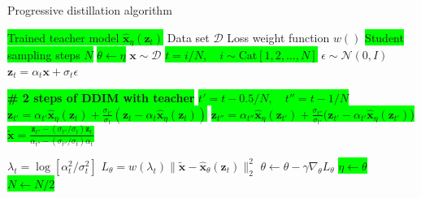 \begin{algorithm}[H]
    \centering
    \caption{Progressive distillation algorithm \cite{v_prediction}}
    \label{alg:progressive_distillation_algorithm}
    \begin{algorithmic}
        \Require \colorbox{lime} {Trained teacher model $\hat{\mathbf{x}}_{\eta}(\mathbf{z}_t)$}
        \Require Data set $\mathcal{D}$
        \Require Loss weight function $w()$
        \Require \colorbox{lime}{Student sampling steps $N$}
            \State \colorbox{lime}{$\theta \gets \eta$} 
                \State $\mathbf{x} \sim \mathcal{D}$
                \State \colorbox{lime}{$t = i/N, \quad i \sim \text{Cat}[1,2,\dots,N]$}
                \State $\epsilon \sim \mathcal{N}(0, I)$
                \State $\mathbf{z}_t = \alpha_t \mathbf{x} + \sigma_t \epsilon$
                
                \State \colorbox{lime}{{\textbf{\# 2 steps of DDIM with teacher}}}
                \State \colorbox{lime}{{$t' = t - 0.5/N, \quad t'' = t - 1/N$}}
                \State \colorbox{lime}{{$\mathbf{z}_{t'} = \alpha_{t'} \hat{\mathbf{x}}_{\eta}(\mathbf{z}_t) + \frac{\sigma_{t'}}{\sigma_t} (\mathbf{z}_t - \alpha_t \hat{\mathbf{x}}_{\eta}(\mathbf{z}_t))$}}
                \State \colorbox{lime}{{$\mathbf{z}_{t''} = \alpha_{t''} \hat{\mathbf{x}}_{\eta}(\mathbf{z}_{t'}) + \frac{\sigma_{t''}}{\sigma_{t'}} (\mathbf{z}_{t'} - \alpha_{t'} \hat{\mathbf{x}}_{\eta}(\mathbf{z}_{t'})$)}}
                \State \colorbox{lime}{{$\tilde{\mathbf{x}} = \frac{\mathbf{z}_{t''} - (\sigma_{t''}/\sigma_t) \mathbf{z}_t}{\alpha_{t''} - (\sigma_{t''}/\sigma_t) \alpha_t}$}} 
                
                \State $\lambda_t = \log[\alpha_t^2/\sigma_t^2]$
                \State $L_{\theta} = w(\lambda_t) \|\tilde{\mathbf{x}} - \hat{\mathbf{x}}_{\theta}(\mathbf{z}_t)\|_2^2$
                \State $\theta \gets \theta - \gamma \nabla_{\theta} L_{\theta}$
            \EndWhile
            \State \colorbox{lime}{$\eta \gets \theta$} 
            \State \colorbox{lime}{$N \gets N/2$} 
        \EndFor
    \end{algorithmic}
\end{algorithm}











